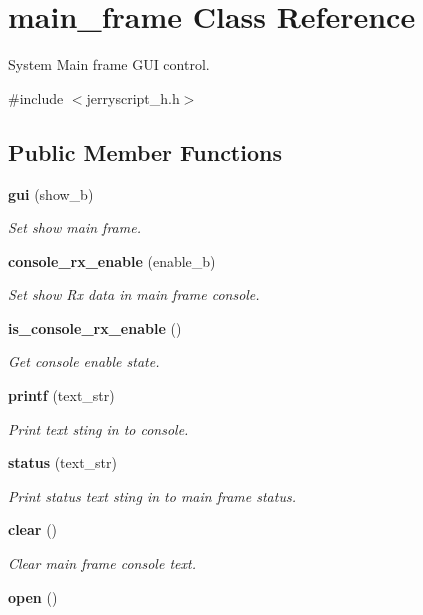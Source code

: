 \section{main\+\_\+frame Class Reference}
\label{classmain__frame}


System Main frame G\+UI control.  




{\ttfamily \#include $<$jerryscript\+\_\+h.\+h$>$}

\subsection*{Public Member Functions}
\begin{DoxyCompactItemize}
\item 
\textbf{ gui} (show\+\_\+b)
\begin{DoxyCompactList}\small\item\em Set show main frame. \end{DoxyCompactList}\item 
\textbf{ console\+\_\+rx\+\_\+enable} (enable\+\_\+b)
\begin{DoxyCompactList}\small\item\em Set show Rx data in main frame console. \end{DoxyCompactList}\item 
\textbf{ is\+\_\+console\+\_\+rx\+\_\+enable} ()
\begin{DoxyCompactList}\small\item\em Get console enable state. \end{DoxyCompactList}\item 
\textbf{ printf} (text\+\_\+str)
\begin{DoxyCompactList}\small\item\em Print text sting in to console. \end{DoxyCompactList}\item 
\textbf{ status} (text\+\_\+str)
\begin{DoxyCompactList}\small\item\em Print status text sting in to main frame status. \end{DoxyCompactList}\item 
\textbf{ clear} ()
\begin{DoxyCompactList}\small\item\em Clear main frame console text. \end{DoxyCompactList}\item 
\textbf{ open} ()

\end{DoxyCompactItemize}
